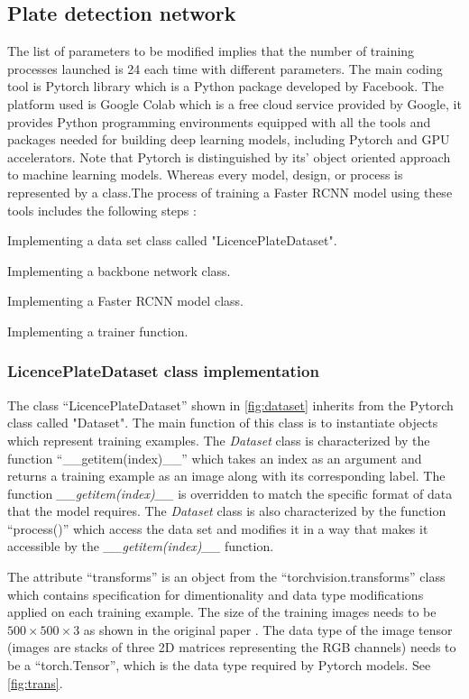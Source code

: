 \subsection{Plate detection network}
The list of parameters to be modified implies that the number of training processes launched is 24 each time with different parameters. The main coding tool is Pytorch library which is a Python package developed by Facebook. The platform used is Google Colab which is a free cloud service provided by Google, it provides Python programming environments equipped with all the tools and packages needed for building deep learning models, including Pytorch and GPU accelerators.
Note that Pytorch is distinguished by its' object oriented approach to machine learning models. Whereas every model, design, or process is represented by a class.The process of training a Faster RCNN model using these tools includes the following steps :
\begin{compactitem}
	\item Implementing a data set class called "LicencePlateDataset".
	\item Implementing a backbone network class.
	\item Implementing a Faster RCNN model class.
	\item Implementing a trainer function.
\end{compactitem}

\subsubsection{LicencePlateDataset class implementation }
The class ``LicencePlateDataset'' shown in \cref{fig:dataset} inherits from the Pytorch class called "Dataset". The main function of this class is to instantiate objects which represent training examples. The \emph{Dataset} class is characterized by the function ``\_\_getitem(index)\_\_'' which takes an index as an argument and returns a training example as an image along with its corresponding label. The function \emph{\_\_getitem(index)\_\_} is overridden to match the specific format of data that the model requires. The \emph{Dataset} class is also characterized by the function ``process()'' which access the data set and modifies it in a way that makes it accessible by the \emph{\_\_getitem(index)\_\_} function.

The attribute ``transforms'' is an object from the ``torchvision.transforms'' class which contains specification for dimentionality and data type modifications applied on each training example. The size of the training images needs to be $500 \times 500 \times 3$ as shown in the original paper \cite{b6}. The data type of the image tensor (images are stacks of three 2D matrices representing the RGB channels) needs to be a ``torch.Tensor'', which is the data type required by Pytorch models. See \cref{fig:trans}.


